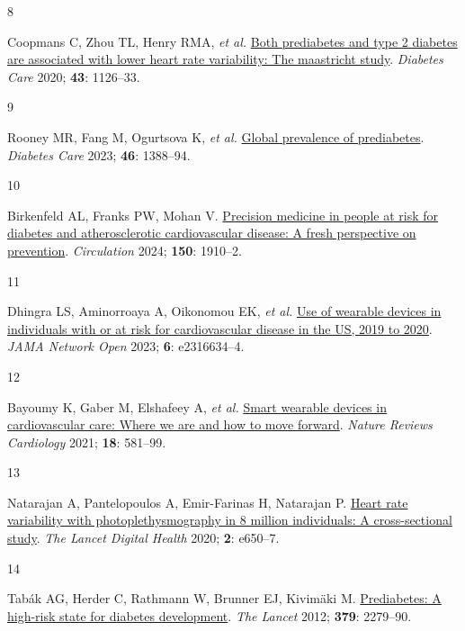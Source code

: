 \documentclass[
  letterpaper,
  headsepline=true,
  open=any]{scrbook}
\newlength{\cslhangindent}
\newlength{\csllabelwidth}
\newlength{\cslentryspacingunit} %
\newenvironment{CSLReferences}[2] %
 {%
  \setlength{\parindent}{0pt}
  \ifodd #1
  \let\oldpar\par
  \def\par{\hangindent=\cslhangindent\oldpar}
  \fi
  \setlength{\parskip}{#2\cslentryspacingunit}
 }%
 {}
\newcommand{\CSLLeftMargin}[1]{\parbox[t]{\csllabelwidth}{#1}}
\newcommand{\CSLRightInline}[1]{\parbox[t]{\linewidth - \csllabelwidth}{#1}\break}
\begin{document}
\begin{CSLReferences}{0}{0}
\leavevmode{}%
\CSLLeftMargin{8 }%
\CSLRightInline{Coopmans C, Zhou TL, Henry RMA, \emph{et al.}
\href{https://doi.org/10.2337/dc19-2367}{Both prediabetes and type 2
diabetes are associated with lower heart rate variability: The
maastricht study}. \emph{Diabetes Care} 2020; \textbf{43}: 1126--33.}

\leavevmode{}%
\CSLLeftMargin{9 }%
\CSLRightInline{Rooney MR, Fang M, Ogurtsova K, \emph{et al.}
\href{https://doi.org/10.2337/dc22-2376}{Global prevalence of
prediabetes}. \emph{Diabetes Care} 2023; \textbf{46}: 1388--94.}

\leavevmode{}%
\CSLLeftMargin{10 }%
\CSLRightInline{Birkenfeld AL, Franks PW, Mohan V.
\href{https://doi.org/10.1161/CIRCULATIONAHA.124.070463}{Precision
medicine in people at risk for diabetes and atherosclerotic
cardiovascular disease: A fresh perspective on prevention}.
\emph{Circulation} 2024; \textbf{150}: 1910--2.}

\leavevmode{}%
\CSLLeftMargin{11 }%
\CSLRightInline{Dhingra LS, Aminorroaya A, Oikonomou EK, \emph{et al.}
\href{https://doi.org/10.1001/jamanetworkopen.2023.16634}{Use of
wearable devices in individuals with or at risk for cardiovascular
disease in the US, 2019 to 2020}. \emph{JAMA Network Open} 2023;
\textbf{6}: e2316634--4.}

\leavevmode{}%
\CSLLeftMargin{12 }%
\CSLRightInline{Bayoumy K, Gaber M, Elshafeey A, \emph{et al.}
\href{https://doi.org/10.1038/s41569-021-00522-7}{Smart wearable devices
in cardiovascular care: Where we are and how to move forward}.
\emph{Nature Reviews Cardiology} 2021; \textbf{18}: 581--99.}

\leavevmode{}%
\CSLLeftMargin{13 }%
\CSLRightInline{Natarajan A, Pantelopoulos A, Emir-Farinas H, Natarajan
P. \href{https://doi.org/10.1016/S2589-7500(20)30246-6}{Heart rate
variability with photoplethysmography in 8 million individuals: A
cross-sectional study}. \emph{The Lancet Digital Health} 2020;
\textbf{2}: e650--7.}

\leavevmode{}%
\CSLLeftMargin{14 }%
\CSLRightInline{Tabák AG, Herder C, Rathmann W, Brunner EJ, Kivimäki M.
\href{https://doi.org/10.1016/S0140-6736(12)60283-9}{Prediabetes: A
high-risk state for diabetes development}. \emph{The Lancet} 2012;
\textbf{379}: 2279--90.}


\end{CSLReferences}
\end{document}

